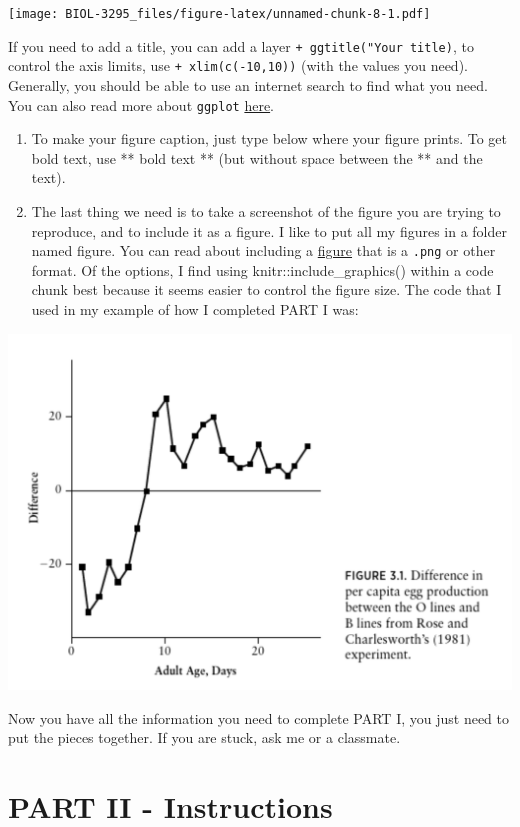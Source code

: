 \documentclass[
]{book}
\begin{document}
\texttt{[image: BIOL-3295\_files/figure-latex/unnamed-chunk-8-1.pdf]}

If you need to add a title, you can add a layer \texttt{+\ ggtitle("Your\ title)}, to control the axis limits, use \texttt{+\ xlim(c(-10,10))} (with the values you need). Generally, you should be able to use an internet search to find what you need. You can also read more about \texttt{ggplot} \href{https://ahurford.github.io/quant-guide-all-courses/ggplot.html}{here}.

\begin{enumerate}
\def\labelenumi{\arabic{enumi}.}
\setcounter{enumi}{6}
\item
  To make your figure caption, just type below where your figure prints. To get bold text, use ** bold text ** (but without space between the ** and the text).
\item
  The last thing we need is to take a screenshot of the figure you are trying to reproduce, and to include it as a figure. I like to put all my figures in a folder named figure. You can read about including a \href{https://bookdown.org/yihui/rmarkdown/r-code.html\#figures}{figure} that is a \texttt{.png} or other format. Of the options, I find using knitr::include\_graphics() within a code chunk best because it seems easier to control the figure size. The code that I used in my example of how I completed PART I was:
\end{enumerate}

\includegraphics[width=0.9\linewidth]{figures/actual-fig}

Now you have all the information you need to complete PART I, you just need to put the pieces together. If you are stuck, ask me or a classmate.

\hypertarget{partII}{%
\chapter*{PART II - Instructions}\label{partII}}
\end{document}
